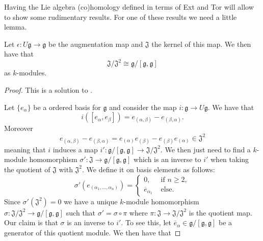 Having the Lie algebra (co)homology defined in terms of Ext and Tor will allow to show some rudimentary results. For one of these results we need a little lemma.
\begin{lemma}
  Let $ \epsilon: U\mathfrak{g} \to \mathfrak{g} $ be the augmentation map and $ \mathfrak{J} $ the kernel of this map. We then have that
  \begin{equation}
    \mathfrak{J}/\mathfrak{J}^2 \cong \mathfrak{g}/[\mathfrak{g}, \mathfrak{g}]
    \label{eq:abelianization}
  \end{equation}
  as $ k $-modules.
\end{lemma}
\begin{proof}
  This is a solution to \cite[Exercise 7.4.1]{weibel1994homological}.

  Let $ \{e_\alpha\} $ be a ordered basis for $ \mathfrak{g} $ and consider the map $ i: \mathfrak{g} \to U\mathfrak{g} $. We have that
  \begin{equation}
    i([e_{\alpha},e_{\beta}]) = e_{(\alpha, \beta)} - e_{(\beta, \alpha)}.
  \end{equation}
  Moreover
  \begin{equation}
    e_{(\alpha,\beta)} - e_{(\beta, \alpha)} = e_{(\alpha)}e_{(\beta)} - e_{(\beta)}e_{(\alpha)} \in \mathfrak{J}^2
  \end{equation}
  meaning that $ i $ induces a map $ i':\mathfrak{g}/[\mathfrak{g}, \mathfrak{g}] \to \mathfrak{J}/\mathfrak{J}^2 $. We then just need to find a $ k $-module homomorphism $ \sigma': \mathfrak{J} \to \mathfrak{g}/[\mathfrak{g}, \mathfrak{g}] $ which is an inverse to $ i' $ when taking the quotient of $ \mathfrak{J} $ with $ \mathfrak{J}^2 $. We define it on basis elements as follows:
  \begin{equation}
    \sigma'(e_{(\alpha_1, \ldots, \alpha_n)}) = \begin{cases}
      0, &\text{ if } n \geq 2, \\
      \overline{e}_{\alpha_1} &\text{ else.}
    \end{cases}
  \end{equation}
  Since $ \sigma'(\mathfrak{J}^2) = 0 $ we have a unique $ k $-module homomorphism $ \sigma: \mathfrak{J}/\mathfrak{J}^2 \to \mathfrak{g}/[\mathfrak{g}, \mathfrak{g}] $ such that $ \sigma' = \sigma \circ \pi $ where $ \pi: \mathfrak{J} \to \mathfrak{J}/\mathfrak{J}^2 $ is the quotient map. Our claim is that $ \sigma $ is an inverse to $ i' $. To see this, let $ \overline{e}_\alpha \in \mathfrak{g}/[\mathfrak{g}, \mathfrak{g}] $ be a generator of this quotient module. We then have that

\end{proof}
